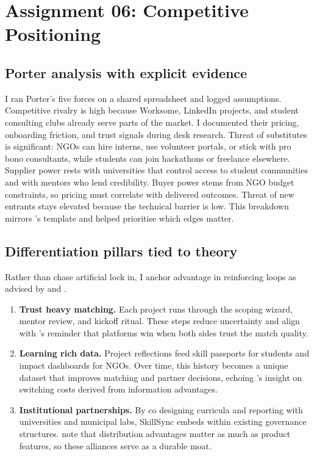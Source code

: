 \section*{Assignment 06: Competitive Positioning}

\subsection*{Porter analysis with explicit evidence}
I ran Porter’s five forces on a shared spreadsheet and logged assumptions. Competitive rivalry is high because Worksome, LinkedIn projects, and student consulting clubs already serve parts of the market. I documented their pricing, onboarding friction, and trust signals during desk research. Threat of substitutes is significant: NGOs can hire interns, use volunteer portals, or stick with pro bono consultants, while students can join hackathons or freelance elsewhere. Supplier power rests with universities that control access to student communities and with mentors who lend credibility. Buyer power stems from NGO budget constraints, so pricing must correlate with delivered outcomes. Threat of new entrants stays elevated because the technical barrier is low. This breakdown mirrors \citet{Porter2008}'s template and helped prioritise which edges matter.

\subsection*{Differentiation pillars tied to theory}
Rather than chase artificial lock in, I anchor advantage in reinforcing loops as advised by \citet{Choudary2016} and \citet{Reillier2017}.
\begin{enumerate}
  \item \textbf{Trust heavy matching.} Each project runs through the scoping wizard, mentor review, and kickoff ritual. These steps reduce uncertainty and align with \citet{HagiuWright2013}'s reminder that platforms win when both sides trust the match quality.
  \item \textbf{Learning rich data.} Project reflections feed skill passports for students and impact dashboards for NGOs. Over time, this history becomes a unique dataset that improves matching and partner decisions, echoing \citet{FarrellSaloner1986}'s insight on switching costs derived from information advantages.
  \item \textbf{Institutional partnerships.} By co designing curricula and reporting with universities and municipal labs, SkillSync embeds within existing governance structures. \citet{ShapiroVarian1999} note that distribution advantages matter as much as product features, so these alliances serve as a durable moat.
\end{enumerate}

